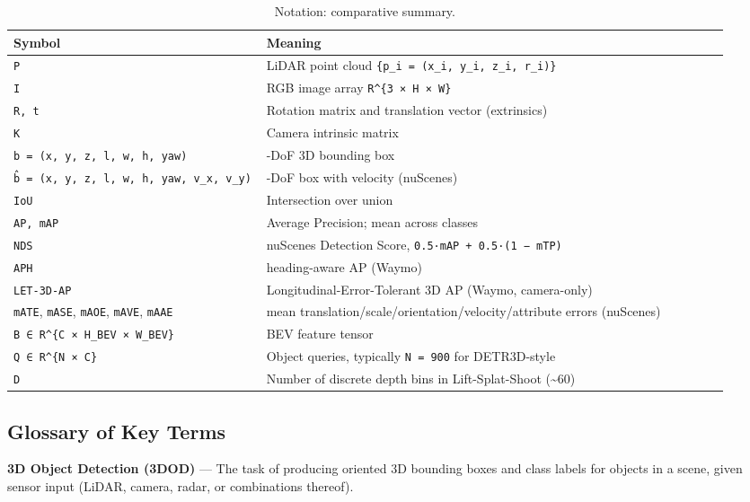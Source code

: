 \documentclass{article}
\begin{document}
\begin{table}[t]
\centering
\caption{Notation: comparative summary.}
\label{tab:notation}
\begin{tabular}{>{\raggedright\arraybackslash}p{0.3545\linewidth}
  >{\raggedright\arraybackslash}p{0.6455\linewidth}}
\toprule
Symbol & Meaning \\
\midrule
\texttt{P} & LiDAR point cloud \texttt{\{p\_i\ =\ (x\_i,\ y\_i,\ z\_i,\ r\_i)\}} \\
\texttt{I} & RGB image array \texttt{R\^{}\{3\ ×\ H\ ×\ W\}} \\
\texttt{R,\ t} & Rotation matrix and translation vector (extrinsics) \\
\texttt{K} & Camera intrinsic matrix \\
\texttt{b\ =\ (x,\ y,\ z,\ l,\ w,\ h,\ yaw)} & 7-DoF 3D bounding box \\
\texttt{b̂\ =\ (x,\ y,\ z,\ l,\ w,\ h,\ yaw,\ v\_x,\ v\_y)} & 9-DoF box with velocity (nuScenes) \\
\texttt{IoU} & Intersection over union \\
\texttt{AP,\ mAP} & Average Precision; mean across classes \\
\texttt{NDS} & nuScenes Detection Score, \texttt{0.5·mAP\ +\ 0.5·(1\ −\ mTP)} \\
\texttt{APH} & heading-aware AP (Waymo) \\
\texttt{LET-3D-AP} & Longitudinal-Error-Tolerant 3D AP (Waymo, camera-only) \\
\texttt{mATE}, \texttt{mASE}, \texttt{mAOE}, \texttt{mAVE}, \texttt{mAAE} & mean translation/scale/orientation/velocity/attribute errors (nuScenes) \\
\texttt{B\ ∈\ R\^{}\{C\ ×\ H\_BEV\ ×\ W\_BEV\}} & BEV feature tensor \\
\texttt{Q\ ∈\ R\^{}\{N\ ×\ C\}} & Object queries, typically \texttt{N\ =\ 900} for DETR3D-style \\
\texttt{D} & Number of discrete depth bins in Lift-Splat-Shoot (\textasciitilde60) \\
\end{tabular}
\end{table}

\subsection{Glossary of Key Terms}\label{glossary-of-key-terms}

\textbf{3D Object Detection (3DOD)} --- The task of producing oriented 3D bounding boxes and class labels for objects in a scene, given sensor input (LiDAR, camera, radar, or combinations thereof).
\end{document}
